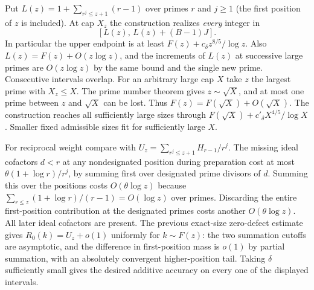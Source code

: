 \documentclass[11pt]{article}
\begin{document}
Put $L(z)=1+\sum_{r^j\le z+1}(r-1)$ over primes $r$ and $j\ge1$ (the first position of $z$ is included). At cap $X_z$ the construction realizes \emph{every} integer in
\[
               [L(z),\,L(z)+(B-1)J].
\]
In particular the upper endpoint is at least $F(z)+c_\delta z^{8/5}/\log z$. Also $L(z)=F(z)+O(z\log z)$, and the increments of $L(z)$ at successive large primes are $O(z\log z)$ by the same bound and the single new prime. Consecutive intervals overlap. For an arbitrary large cap $X$ take $z$ the largest prime with $X_z\le X$. The prime number theorem gives $z\sim\sqrt X$, and at most one prime between $z$ and $\sqrt X$ can be lost. Thus $F(z)=F(\sqrt X)+O(\sqrt X)$. The construction reaches all sufficiently large sizes through $F(\sqrt X)+c'_\delta X^{4/5}/\log X$. Smaller fixed admissible sizes fit for sufficiently large $X$.

For reciprocal weight compare with $U_z=\sum_{r^j\le z+1} H_{r-1}/r^j$. The missing ideal cofactors $d<r$ at any nondesignated position during preparation cost at most $\theta(1+\log r)/r^j$, by summing first over designated prime divisors of $d$. Summing this over the positions costs $O(\theta\log z)$ because $\sum_{r\le z}(1+\log r)/(r-1)=O(\log z)$ over primes. Discarding the entire first-position contribution at the designated primes costs another $O(\theta\log z)$. All later ideal cofactors are present. The previous exact-size zero-defect estimate gives $R_0(k)=U_z+o(1)$ uniformly for $k\sim F(z)$: the two summation cutoffs are asymptotic, and the difference in first-position mass is $o(1)$ by partial summation, with an absolutely convergent higher-position tail. Taking $\delta$ sufficiently small gives the desired additive accuracy on every one of the displayed intervals.
\end{document}
